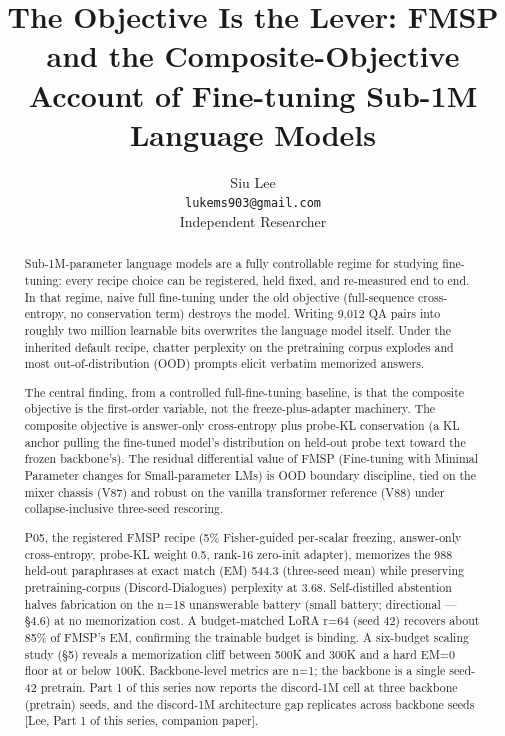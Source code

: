 \documentclass[11pt]{article}
\title{The Objective Is the Lever: FMSP and the Composite-Objective Account of Fine-tuning Sub-1M Language Models}
\author{Siu Lee\\ \texttt{lukems903@gmail.com}\\ Independent Researcher}
\date{}
\begin{document}
\maketitle

\begin{abstract}
Sub-1M-parameter language models are a fully controllable regime for studying fine-tuning: every recipe choice can be registered, held fixed, and re-measured end to end. In that regime, naive full fine-tuning under the old objective (full-sequence cross-entropy, no conservation term) destroys the model. Writing 9{,}012 QA pairs into roughly two million learnable bits overwrites the language model itself. Under the inherited default recipe, chatter perplexity on the pretraining corpus explodes and most out-of-distribution (OOD) prompts elicit verbatim memorized answers.

The central finding, from a controlled full-fine-tuning baseline, is that the composite objective is the first-order variable, not the freeze-plus-adapter machinery. The composite objective is answer-only cross-entropy plus probe-KL conservation (a KL anchor pulling the fine-tuned model's distribution on held-out probe text toward the frozen backbone's). The residual differential value of FMSP (Fine-tuning with Minimal Parameter changes for Small-parameter LMs) is OOD boundary discipline, tied on the mixer chassis (V87) and robust on the vanilla transformer reference (V88) under collapse-inclusive three-seed rescoring.

P05, the registered FMSP recipe (5\% Fisher-guided per-scalar freezing, answer-only cross-entropy, probe-KL weight 0.5, rank-16 zero-init adapter), memorizes the 988 held-out paraphrases at exact match (EM) 544.3 (three-seed mean) while preserving pretraining-corpus (Discord-Dialogues) perplexity at 3.68. Self-distilled abstention halves fabrication on the n=18 unanswerable battery (small battery; directional --- \S4.6) at no memorization cost. A budget-matched LoRA r=64 (seed 42) recovers about 85\% of FMSP's EM, confirming the trainable budget is binding. A six-budget scaling study (\S5) reveals a memorization cliff between 500K and 300K and a hard EM=0 floor at or below 100K. Backbone-level metrics are n=1; the backbone is a single seed-42 pretrain. Part 1 of this series now reports the discord-1M cell at three backbone (pretrain) seeds, and the discord-1M architecture gap replicates across backbone seeds [Lee, Part 1 of this series, companion paper].
\end{abstract}
\end{document}
